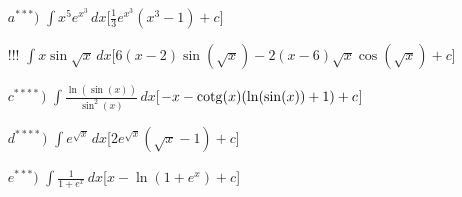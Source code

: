\begin{enumerate}
\begin{enumerate}
\item[$a^{***})$]{$\int x^5 e^{x^3} \,dx $}\hspace{\fill}[$\frac{1}{3}e^{x^3}(x^3-1) +c$]
\item[!!!]{$\int x\sin{\sqrt{x}} \,dx $}\hspace{\fill}[$6(x-2)\sin(\sqrt{x})-2(x-6)\sqrt{x}\cos(\sqrt{x}) +c$]
\item[$c^{****})$]{$\int \frac{\ln(\sin(x))}{\sin^2(x)} \,dx $}\hspace{\fill}[$-x -\operatorname{cotg}(x)(\ln(\sin(x))+1)+c$]
\item[$d^{****})$]{$\int e^{\sqrt{x}} \,dx $}\hspace{\fill}[$2e^{\sqrt{x}}(\sqrt{x}-1)+c$]
\item[$e^{***})$]{$\int \frac{1}{1+e^x} \,dx $}\hspace{\fill}[$x-\ln(1+e^x)+c$]


\end{enumerate}

\end{enumerate}